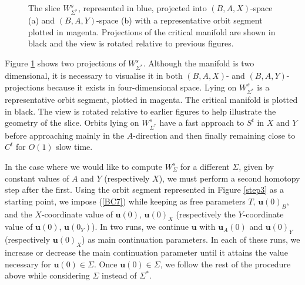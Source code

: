 \documentclass{ws-ijbc}
\begin{document}
\begin{figure}[h]
\centering
{}
\caption{The slice $W^{s}_{\Sigma^*}$, represented in blue, projected into $(B,A,X)$-space (a) and $(B,A,Y)$-space (b) with a representative orbit segment plotted in magenta.  Projections of the critical manifold are shown in black and the view is rotated relative to previous figures.}
\label{piece}
\end{figure}
   
Figure \ref{piece} shows two projections of $W^s_{\Sigma^*}$.  Although the manifold is two dimensional, it is necessary to visualise it in both $(B,A,X)$- and $(B,A,Y)$-projections because it exists in four-dimensional space.  Lying on $W^s_{\Sigma^*}$ is a representative orbit segment, plotted in magenta.  The critical manifold is plotted in black.  The view is rotated relative to earlier figures to help illustrate the geometry of the slice.  Orbits lying on $W^s_{\Sigma^*}$ have a fast approach to $S^t$ in $X$ and $Y$ before approaching mainly in the $A$-direction and then finally remaining close to $C^t$ for $O(1)$ slow time.
    
In the case where we would like to compute $W^{s}_{\Sigma}$ for a different $\Sigma$, given by constant values of $A$ and $Y$ (respectively $X$), we must perform a second homotopy step after the first.  Using the orbit segment represented in Figure \ref{step3} as a starting point, we impose (\ref{BC7}) while keeping as free parameters $T$, $\mathbf{u}(0)_B$, and the $X$-coordinate value of $\mathbf{u}(0)$, $\mathbf{u}(0)_X$ (respectively the $Y$-coordinate value of $\mathbf{u}(0)$, $\mathbf{u}(0_Y)$).  In two runs, we continue $\mathbf{u}$ with $\mathbf{u}_A(0)$ and $\mathbf{u}(0)_Y$ (respectively $\mathbf{u}(0)_X$) as main continuation parameters.  In each of these runs, we increase or decrease the main continuation parameter until it attains the value necessary for $\mathbf{u}(0) \in \Sigma$.  Once $\mathbf{u}(0) \in \Sigma$, we follow the rest of the procedure above while considering $\Sigma$ instead of $\Sigma^*$.
    
\end{document}
